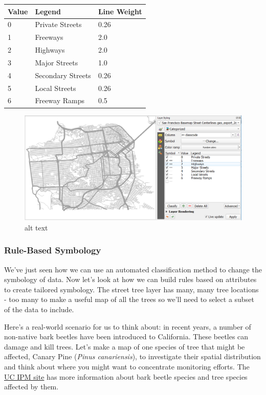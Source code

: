 \documentclass[
]{article}
\begin{document}
\begin{longtable}[]{@{}lll@{}}
\toprule()
Value & Legend & Line Weight \\
\midrule()
\endhead
0 & Private Streets & 0.26 \\
1 & Freeways & 2.0 \\
2 & Highways & 2.0 \\
3 & Major Streets & 1.0 \\
4 & Secondary Streets & 0.26 \\
5 & Local Streets & 0.26 \\
6 & Freeway Ramps & 0.5 \\
\bottomrule()
\end{longtable}

\begin{figure}
\centering
\includegraphics{./images/Vector_ClassifiedRoads.PNG}
\caption{alt text}
\end{figure}

\hypertarget{rule-based-symbology}{%
\subsubsection{Rule-Based Symbology}\label{rule-based-symbology}}

We've just seen how we can use an automated classification method to change the symbology of data. Now let's look at how we can build rules based on attributes to create tailored symbology. The street tree layer has many, many tree locations - too many to make a useful map of all the trees so we'll need to select a subset of the data to include.

Here's a real-world scenario for us to think about: in recent years, a number of non-native bark beetles have been introduced to California. These beetles can damage and kill trees. Let's make a map of one species of tree that might be affected, Canary Pine (\emph{Pinus canariensis}), to investigate their spatial distribution and think about where you might want to concentrate monitoring efforts. The \href{http://ipm.ucanr.edu/PMG/PESTNOTES/pn7421.html}{UC IPM site} has more information about bark beetle species and tree species affected by them.
\end{document}
